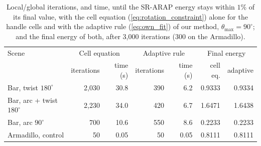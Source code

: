 \documentclass{birkjour}
\theoremstyle{remark}
\numberwithin{equation}{section}
\begin{document}
\begin{table}[t]
  \centering
  \caption{Local/global iterations, and time, until the SR-ARAP energy stays within $1\%$ of its final value, with the cell equation (\ref{eq:rotation_constraint}) alone for the handle cells and with the adaptive rule (\ref{eq:own_fit}) of our method, $\theta_{\max} = 90^\circ$; and the final energy of both, after 3{,}000 iterations (300 on the Armadillo).}
  \label{tab:adaptive}
  {\scriptsize\setlength{\tabcolsep}{2.5pt}
  \begin{tabular}{lrrrrrr}
    \toprule
    Scene & \multicolumn{2}{c}{Cell equation} & \multicolumn{2}{c}{Adaptive rule} & \multicolumn{2}{c}{Final energy} \\
     & iterations & time (s) & iterations & time (s) & cell eq. & adaptive \\
    \midrule
    Bar, twist $180^\circ$              & 2{,}030 & 30.8 & 390 & 6.2  & 0.9333 & 0.9334 \\
    Bar, arc + twist $180^\circ$ & 2{,}230 & 34.0 & 420 & 6.7  & 1.6471 & 1.6438 \\
    Bar, arc $90^\circ$                 & 700     & 10.6 & 550 & 8.6  & 0.2233 & 0.2233 \\
    Armadillo, control                  & 50      & 0.05 & 50  & 0.05 & 0.8111 & 0.8111 \\
    \bottomrule
  \end{tabular}}
\end{table}
\end{document}
